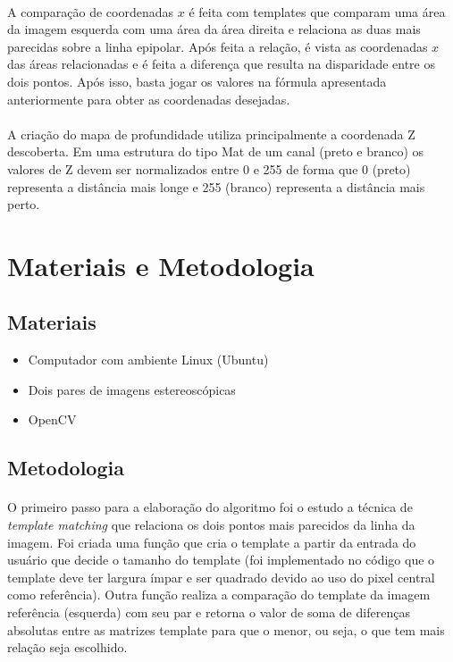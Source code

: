 \documentclass[conference, harvard, brazil, english]{sbatex}
\begin{document}
	\paragraph{}
		A comparação de coordenadas $x$ é feita com templates que comparam uma área da imagem esquerda com uma área da área direita e relaciona as duas mais parecidas sobre a linha epipolar. Após feita a relação, é vista as coordenadas $x$ das áreas relacionadas e é feita a diferença que resulta na disparidade entre os dois pontos. Após isso, basta jogar os valores na fórmula apresentada anteriormente para obter as coordenadas desejadas.
	\paragraph{}
		A criação do mapa de profundidade utiliza principalmente a coordenada Z descoberta. Em uma estrutura do tipo Mat de um canal (preto e branco) os valores de Z devem ser normalizados entre 0 e 255 de forma que 0 (preto) representa a distância mais longe e 255 (branco) representa a distância mais perto.
	
	\section{Materiais e Metodologia}
	\subsection{Materiais}
		\begin{itemize}
			\item Computador com ambiente Linux (Ubuntu)
			\item Dois pares de imagens estereoscópicas
			\item OpenCV
		\end{itemize}
	\subsection{Metodologia}
		\paragraph{}	
			O primeiro passo para a elaboração do algoritmo foi o estudo a técnica de \textit{template matching} que relaciona os dois pontos mais parecidos da linha da imagem. Foi criada uma função que cria o template a partir da entrada do usuário que decide o tamanho do template (foi implementado no código que o template deve ter largura ímpar e ser quadrado devido ao uso do pixel central como referência). Outra função realiza a comparação do template da imagem referência (esquerda) com seu par e retorna o valor de soma de diferenças absolutas entre as matrizes template para que o menor, ou seja, o que tem mais relação seja escolhido.
\end{document}
